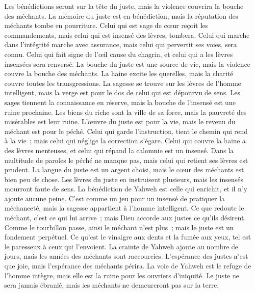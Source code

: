 \begin{multicols}{2}
Les bénédictions seront sur la tête du juste, mais la violence couvrira la bouche des méchants.
La mémoire du juste est en bénédiction, mais la réputation des méchants tombe en pourriture.
Celui qui est sage de cœur reçoit les commandements, mais celui qui est insensé des lèvres, tombera.
Celui qui marche dans l'intégrité marche avec assurance, mais celui qui pervertit ses voies, sera connu.
Celui qui fait signe de l'œil cause du chagrin, et celui qui a les lèvres insensées sera renversé.
La bouche du juste est une source de vie, mais la violence couvre la bouche des méchants.
La haine excite les querelles, mais la charité couvre toutes les transgressions.
La sagesse se trouve sur les lèvres de l'homme intelligent, mais la verge est pour le dos de celui qui est dépourvu de sens.
Les sages tiennent la connaissance en réserve, mais la bouche de l'insensé est une ruine prochaine.
Les biens du riche sont la ville de sa force, mais la pauvreté des misérables est leur ruine.
L'œuvre du juste est pour la vie, mais le revenu du méchant est pour le péché.
Celui qui garde l'instruction, tient le chemin qui rend à la vie~; mais celui qui néglige la correction s'égare.
Celui qui couvre la haine a des lèvres menteuses, et celui qui répand la calomnie est un insensé.
Dans la multitude de paroles le péché ne manque pas, mais celui qui retient ses lèvres est prudent.
La langue du juste est un argent choisi, mais le cœur des méchants est bien peu de chose.
Les lèvres du juste en instruisent plusieurs, mais les insensés mourront faute de sens.
La bénédiction de Yahweh est celle qui enrichit, et il n'y ajoute aucune peine.
C'est comme un jeu pour un insensé de pratiquer la méchanceté, mais la sagesse appartient à l'homme intelligent.
Ce que redoute le méchant, c'est ce qui lui arrive~; mais Dieu accorde aux justes ce qu'ils désirent.
Comme le tourbillon passe, ainsi le méchant n'est plus~; mais le juste est un fondement perpétuel.
Ce qu'est le vinaigre aux dents et la fumée aux yeux, tel est le paresseux à ceux qui l'envoient.
La crainte de Yahweh ajoute au nombre de jours, mais les années des méchants sont raccourcies.
L'espérance des justes n'est que joie, mais l'espérance des méchants périra.
La voie de Yahweh est le refuge de l'homme intègre, mais elle est la ruine pour les ouvriers d'iniquité.
Le juste ne sera jamais ébranlé, mais les méchants ne demeureront pas sur la terre.

\end{multicols}
